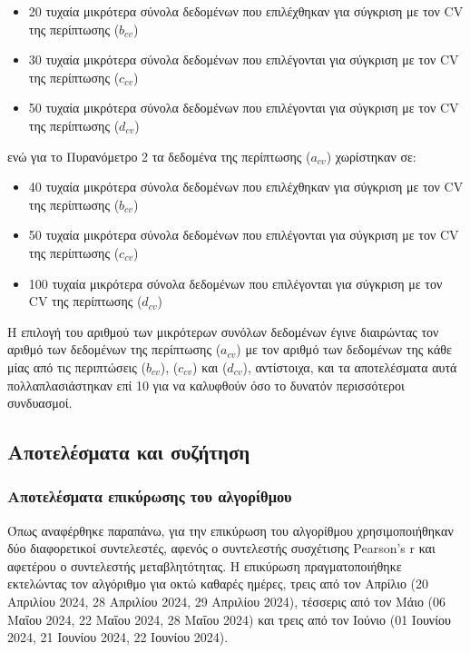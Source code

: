 \documentclass[12pt, a4paper]{report} %
\newcommand{\english}{\foreignlanguage{english}}
\begin{document}
\begin{itemize}
    \item 20 τυχαία μικρότερα σύνολα δεδομένων που επιλέχθηκαν για σύγκριση με τον \english{CV} της περίπτωσης \english{($b_{cv}$)}
    \item 30 τυχαία μικρότερα σύνολα δεδομένων που επιλέγονται για σύγκριση με τον \english{CV} της περίπτωσης \english{($c_{cv}$)}
    \item 50 τυχαία μικρότερα σύνολα δεδομένων που επιλέγονται για σύγκριση με τον \english{CV} της περίπτωσης \english{($d_{cv}$)}
\end{itemize}

\noindent ενώ για το Πυρανόμετρο 2 τα δεδομένα της περίπτωσης \english{($a_{cv}$)} χωρίστηκαν σε:

\begin{itemize}
    \item 40 τυχαία μικρότερα σύνολα δεδομένων που επιλέχθηκαν για σύγκριση με τον \english{CV} της περίπτωσης \english{($b_{cv}$)}
    \item 50 τυχαία μικρότερα σύνολα δεδομένων που επιλέγονται για σύγκριση με τον \english{CV} της περίπτωσης \english{($c_{cv}$)}
    \item 100 τυχαία μικρότερα σύνολα δεδομένων που επιλέγονται για σύγκριση με τον \english{CV} της περίπτωσης \english{($d_{cv}$)}
\end{itemize}

Η επιλογή του αριθμού των μικρότερων συνόλων δεδομένων έγινε διαιρώντας τον αριθμό των δεδομένων της περίπτωσης \english{($a_{cv}$)} 
με τον αριθμό των δεδομένων της κάθε μίας από τις περιπτώσεις \english{($b_{cv}$)}, \english{($c_{cv}$)} και \english{($d_{cv}$)}, 
αντίστοιχα, και τα αποτελέσματα αυτά πολλαπλασιάστηκαν επί 10 για να καλυφθούν όσο το δυνατόν περισσότεροι συνδυασμοί.

\subsection{Αποτελέσματα και συζήτηση}\label{sub_alg_advanc_results}
\subsubsection{Αποτελέσματα επικύρωσης του αλγορίθμου}\label{sub_alg_advanc_valid_results}

Όπως αναφέρθηκε παραπάνω, για την επικύρωση του αλγορίθμου χρησιμοποιήθηκαν δύο διαφορετικοί συντελεστές, αφενός ο συντελεστής 
συσχέτισης \english{Pearson’s r} και αφετέρου ο συντελεστής μεταβλητότητας. Η επικύρωση πραγματοποιήθηκε εκτελώντας τον αλγόριθμο 
για οκτώ καθαρές ημέρες, τρεις από τον Απρίλιο (20 Απριλίου 2024, 28 Απριλίου 2024, 29 Απριλίου 2024), τέσσερις από τον Μάιο 
(06 Μαΐου 2024, 22 Μαΐου 2024, 28 Μαΐου 2024) και τρεις από τον Ιούνιο (01 Ιουνίου 2024, 21 Ιουνίου 2024, 22 Ιουνίου 2024).
\end{document}
